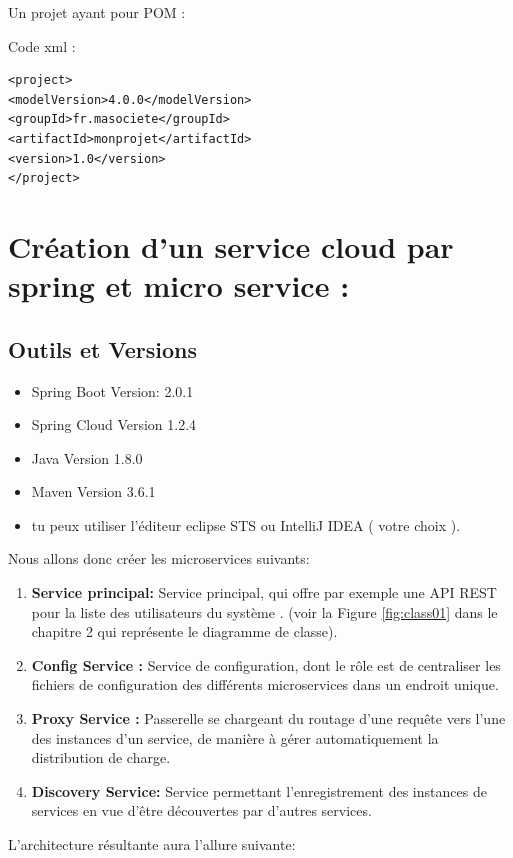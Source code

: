     Un projet ayant pour POM :
    
    Code xml : 
 
     
    \lstset{language=XML}
\begin{lstlisting}
<project>
<modelVersion>4.0.0</modelVersion>
<groupId>fr.masociete</groupId>
<artifactId>monprojet</artifactId>
<version>1.0</version>
</project>
\end{lstlisting}
    











\section{Création d'un service cloud par spring et micro service :}

\subsection{Outils et Versions}

\begin{itemize}
\item Spring Boot Version: 2.0.1
\item Spring Cloud Version 1.2.4
\item Java Version 1.8.0 
\item Maven Version 3.6.1
\item  tu peux utiliser l'éditeur eclipse STS ou IntelliJ IDEA ( votre choix ).
\end{itemize}



Nous allons donc créer les microservices suivants:
\begin{enumerate}
	
\item 	\textbf{Service principal:} Service principal, qui offre par exemple une API REST pour  la liste des utilisateurs du système  . (voir la Figure \ref{fig:class01} dans le chapitre 2 qui représente le diagramme de classe).
	
\item 	\textbf{Config Service :} Service de configuration, dont le rôle est de centraliser les fichiers de configuration des différents microservices dans un endroit unique.
	
\item 		\textbf{Proxy Service :} Passerelle se chargeant du routage d'une requête vers l'une des instances d'un service, de manière à gérer automatiquement la distribution de charge.
	
\item 		\textbf{Discovery Service:} Service permettant l'enregistrement des instances de services en vue d'être découvertes par d'autres services.
\end{enumerate}
L'architecture résultante aura l'allure suivante:


